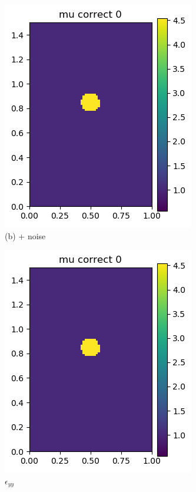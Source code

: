 \documentclass[12pt]{article}
\newcommand{\nhgscalefactor}{0.22}
\newcommand{\nhgfigheight}{3.8cm}
\begin{document}
\begin{figure}
\begin{subfigure}[b]{\nhgscalefactor\linewidth}
   \end{subfigure}
   \begin{subfigure}[b]{\nhgscalefactor\linewidth}
    \includegraphics[totalheight=\nhgfigheight]{Figures/strain/ex1/mucomp00.png}
    \caption{(b) + noise}
   \end{subfigure}
   \begin{subfigure}[b]{\nhgscalefactor\linewidth}
    \includegraphics[totalheight=\nhgfigheight]{Figures/strain/ex1/mucomp00.png}
    \caption{$\epsilon_{yy}$}
   \end{subfigure}
   \begin{subfigure}[b]{\nhgscalefactor\linewidth}

\end{subfigure}
\end{figure}
\end{document}
